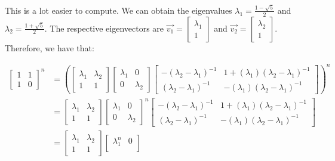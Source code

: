 \documentclass{article}
\begin{document}
This is a lot easier to compute. We can obtain the eigenvalues 
$\lambda_{1}=\frac{1-\sqrt{5}}{2}$ and $\lambda_{2}=\frac{1+\sqrt{5}}{2}$. 
The respective eigenvectors are 
$\vec{v_1}= \begin{bmatrix}\lambda_{1} \\ 1 \end{bmatrix}$ and 
$\vec{v_2} = \begin{bmatrix}\lambda_{2} \\ 1 \end{bmatrix}$. 
Therefore, we have that:

\begin{align*}
\begin{bmatrix}
1 & 1 \\
1 & 0 
\end{bmatrix}^{n}
&=
\left(
\begin{bmatrix}
\lambda_{1} & \lambda_{2} \\
1 & 1 
\end{bmatrix}
\begin{bmatrix}
\lambda_{1} & 0 \\
0 & \lambda_{2} 
\end{bmatrix}
\begin{bmatrix}
-(\lambda_{2}-\lambda_{1})^{-1} & 1+(\lambda_{1})(\lambda_{2}-\lambda_{1})^{-1} \\
(\lambda_{2}-\lambda_{1})^{-1} & -(\lambda_{1})(\lambda_{2}-\lambda_{1})^{-1} 
\end{bmatrix}
\right)^{n} \\
&=
\begin{bmatrix}
\lambda_{1} & \lambda_{2} \\
1 & 1 
\end{bmatrix}
\begin{bmatrix}
\lambda_{1} & 0 \\
0 & \lambda_{2} 
\end{bmatrix}^{n}
\begin{bmatrix}
-(\lambda_{2}-\lambda_{1})^{-1} & 1+(\lambda_{1})(\lambda_{2}-\lambda_{1})^{-1} \\
(\lambda_{2}-\lambda_{1})^{-1} & -(\lambda_{1})(\lambda_{2}-\lambda_{1})^{-1} 
\end{bmatrix}\\
&=
\begin{bmatrix}
\lambda_{1} & \lambda_{2} \\
1 & 1 
\end{bmatrix}
\begin{bmatrix}
\lambda_{1}^{n} & 0 \\

\end{bmatrix}
\end{align*}
\end{document}
